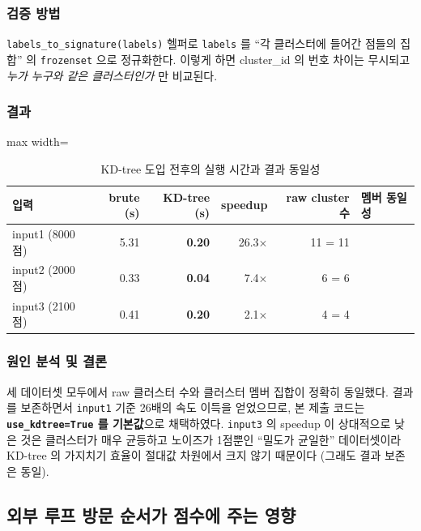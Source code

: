 \documentclass[12pt, a4paper]{article}
\newcommand{\cmark}{\ding{51}}
\begin{document}
\subsubsection*{검증 방법}

\texttt{labels\_to\_signature(labels)} 헬퍼로 \texttt{labels} 를 ``각 클러스터에 들어간 점들의 집합'' 의 \texttt{frozenset} 으로 정규화한다. 이렇게 하면 cluster\_id 의 번호 차이는 무시되고 \emph{누가 누구와 같은 클러스터인가} 만 비교된다.

\subsubsection*{결과}

\begin{table}[h]
\centering
\begin{adjustbox}{max width=\textwidth}
\begin{tabular}{lrrrrl}
\toprule
\textbf{입력} & \textbf{brute (s)} & \textbf{KD-tree (s)} & \textbf{speedup} & \textbf{raw cluster 수} & \textbf{멤버 동일성} \\
\midrule
input1 (8000점) & 5.31 & \textbf{0.20} & 26.3$\times$ & 11 = 11 & \cmark \\
input2 (2000점) & 0.33 & \textbf{0.04} &  7.4$\times$ &  6 = 6  & \cmark \\
input3 (2100점) & 0.41 & \textbf{0.20} &  2.1$\times$ &  4 = 4  & \cmark \\
\bottomrule
\end{tabular}
\end{adjustbox}
\caption{KD-tree 도입 전후의 실행 시간과 결과 동일성}
\end{table}

\subsubsection*{원인 분석 및 결론}

세 데이터셋 모두에서 raw 클러스터 수와 클러스터 멤버 집합이 정확히 동일했다. 결과를 보존하면서 \texttt{input1} 기준 26배의 속도 이득을 얻었으므로, 본 제출 코드는 \textbf{\texttt{use\_kdtree=True} 를 기본값}으로 채택하였다. \texttt{input3} 의 speedup 이 상대적으로 낮은 것은 클러스터가 매우 균등하고 노이즈가 1점뿐인 ``밀도가 균일한'' 데이터셋이라 KD-tree 의 가지치기 효율이 절대값 차원에서 크지 않기 때문이다 (그래도 결과 보존은 동일).


\subsection{외부 루프 방문 순서가 점수에 주는 영향}
\label{sec:exp-order}
\end{document}
